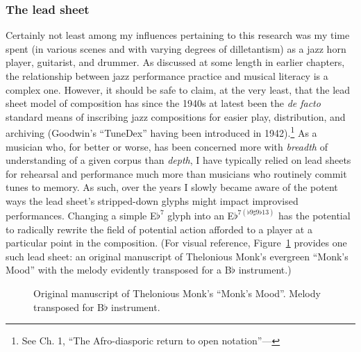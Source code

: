     \subsubsection{The lead sheet}
    
    Certainly not least among my influences pertaining to this research was my time spent (in various scenes and with varying degrees of dilletantism) as a jazz horn player, guitarist, and drummer. As discussed at some length in earlier chapters, the relationship between jazz performance practice and musical literacy is a complex one. However, it should be safe to claim, at the very least, that the lead sheet model of composition has since the 1940s at latest been the \textit{de facto} standard means of inscribing jazz compositions for easier play, distribution, and archiving (Goodwin's ``TuneDex'' having been introduced in 1942).\footnote{See Ch. 1, ``The Afro-diasporic return to open notation''---\autocite[]{Abel_2016}} As a musician who, for better or worse, has been concerned more with \textit{breadth} of understanding of a given corpus than \textit{depth}, I have typically relied on lead sheets for rehearsal and performance much more than musicians who routinely commit tunes to memory. As such, over the years I slowly became aware of the potent ways the lead sheet's stripped-down glyphs might impact improvised performances. Changing a simple E$\flat^{7}$ glyph into an E$\flat^{7(\flat 9 \sharp 9 \flat 13)}$ has the potential to radically rewrite the field of potential action afforded to a player at a particular point in the composition. (For visual reference, Figure~\ref{fig:monk} provides one such lead sheet: an original manuscript of Thelonious Monk's evergreen ``Monk's Mood'' with the melody evidently transposed for a B$\flat$ instrument.)

    \begin{figure}
        \centering
        \captionsetup{width=.5\textwidth}
        \caption[Original manuscript of Thelonious Monk's ``Monk's Mood''. Melody transposed for B$\flat$ instrument.]{Original manuscript of Thelonious Monk's ``Monk's Mood''. Melody transposed for B$\flat$ instrument.\footnotemark}
        \label{fig:monk}
    \end{figure}

